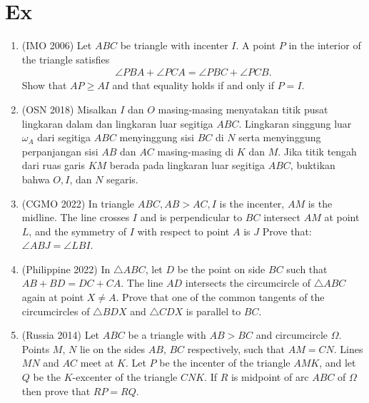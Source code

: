 \documentclass[11pt]{scrartcl}
\begin{document}
\section{Ex}
\begin{enumerate}[resume]
\item (IMO 2006) Let $ABC$ be triangle with incenter $I$. A point $P$ in the interior of the triangle satisfies
\begin{align*}
    \angle PBA + \angle PCA = \angle PBC + \angle PCB.
\end{align*}
Show that $AP \ge AI$ and that equality holds if and only if $P=I$.

\item (OSN 2018) Misalkan $I$ dan $O$ masing-masing menyatakan titik pusat lingkaran dalam dan lingkaran luar segitiga $ABC$. Lingkaran singgung luar $\omega_A$ dari segitiga $ABC$ menyinggung sisi $BC$ di $N$ serta menyinggung perpanjangan sisi $AB$ dan $AC$ masing-masing di $K$ dan $M$. Jika titik tengah dari ruas garis $KM$ berada pada lingkaran luar segitiga $ABC$, buktikan bahwa $O,I$, dan $N$ segaris.


\item (CGMO 2022) In triangle $ABC,AB>AC,I$ is the incenter, $AM$ is the midline. The line crosses $I$ and is perpendicular to $BC $ intersect $AM$ at point $L$, and the symmetry of $I$ with respect to point $A$ is $J$
Prove that: $\angle ABJ= \angle LBI$.

\item (Philippine 2022) In $\triangle ABC$, let $D$ be the point on side $BC$ such that $AB+BD=DC+CA.$ The line $AD$ intersects the circumcircle of $\triangle ABC$ again at point $X \neq A$. Prove that one of the common tangents of the circumcircles of $\triangle BDX$ and $\triangle CDX$ is parallel to $BC$.

\item 	(Russia 2014) Let $ABC$ be a triangle with $AB>BC$ and circumcircle $\Omega$. Points $M$, $N$ lie on the sides $AB$, $BC$ respectively, such that $AM=CN$. Lines $MN$ and $AC$ meet at $K$. Let $P$ be the incenter of the triangle $AMK$, and let $Q$ be the $K$-excenter of the triangle $CNK$. If $R$ is midpoint of arc $ABC$ of $\Omega$ then prove that $RP=RQ$.


\end{enumerate}
\end{document}
